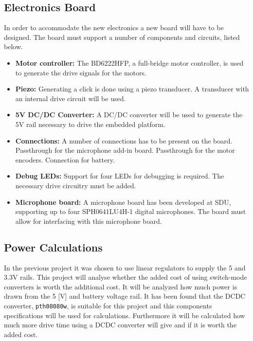 \subsection{Electronics Board} %
\label{sub:electronics_board}
In order to accommodate the new electronics a new board will have to be designed.
The board must support a number of components and circuits, listed below.
\begin{itemize}
	\item \textbf{Motor controller:} The BD6222HFP, a full-bridge motor controller, is used to generate the drive signals for the motors.
	\item \textbf{Piezo:} Generating a click is done using a piezo transducer.
	A transducer with an internal drive circuit will be used.
	\item \textbf{5V DC/DC Converter:} A DC/DC converter will be used to generate the 5V rail necessary to drive the embedded platform.
	\item \textbf{Connections:} A number of connections has to be present on the board.
	Passthrough for the microphone add-in board.
	Passthrough for the motor encoders.
	Connection for battery.
	\item \textbf{Debug LEDs:} Support for four LEDs for debugging is required.
	The necessary drive circuitry must be added.
	\item \textbf{Microphone board:} A microphone board has been developed at SDU, supporting up to four SPH0641LU4H-1 digital microphones. The board must allow for interfacing with this microphone board.
\end{itemize}


\subsection{Power Calculations} %
\label{sub:power_calculations}
In the previous project it was chosen to use linear regulators to supply the 5 and 3.3V rails.
This project will analyse whether the added cost of using switch-mode converters is worth the additional cost.
It will be analyzed how much power is drawn from the 5 [V] and battery voltage rail.
It has been found that the DCDC converter, \texttt{pth08080w}, is suitable for this project and this components specifications will be used for calculations. 
Furthermore it will be calculated how much more drive time using a DCDC converter will give and if it is worth the added cost. 

